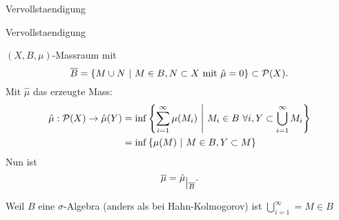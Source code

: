 \documentclass[class=article, crop=false]{standalone}
\begin{document}
\begin{zettel}{Vervollstaendigung}
\begin{flashcard}[4v8te4xo]{Vervollstaendigung}

	\begin{definition}[Vervollstaendigung]
		$(X,B,\mu)$-Massraum mit
		\[
			\bar{B} = \set{M \cup N}{M \in B, N \subset  X \tx{mit} \hat{\mu } = 0} \subset \Pot(X)
		.\]
		Mit $\hat{\mu }$ das erzeugte Mass:
		\begin{align*}
			\hat{\mu} : \Pot(X) \to  \hat{\mu }(Y) & = \inf \set{\sum_{i = 1}^{\infty}\mu(M_i)}{M_i \in B \forall i , Y \subset \bigcup_{i = 1}^{\infty}M_i} \\
			                                       & = \inf \set{\mu(M)}{M \in B, Y \subset  M}
		\end{align*}
		Nun ist
		\[
			\overline{\mu } = \hat{\mu } _{\big{|_{\overline{B}}}}
		.\]
	\end{definition}
	\begin{remark}
		Weil $B$ eine $\sigma$-Algebra (anders als bei Hahn-Kolmogorov) ist $\bigcup_{i = 1}^{\infty}= M \in B$
	\end{remark}
\end{flashcard}
\end{zettel}
\end{document}
